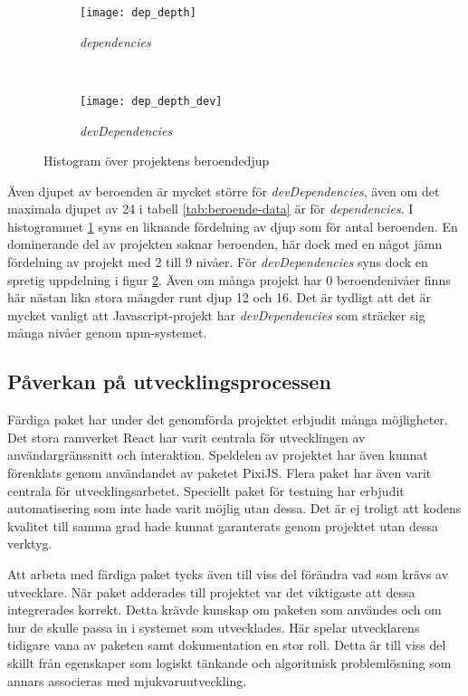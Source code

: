 \begin{figure*}
    \centering
    \begin{subfigure}[]{0.5\textwidth}
        \centering
        \texttt{[image: dep\_depth]}
        \caption{\textit{dependencies}}
        \label{fig:dep-depth-dependencies}
    \end{subfigure}%
    ~
    \begin{subfigure}[]{0.5\textwidth}
        \centering
        \texttt{[image: dep\_depth\_dev]}
        \caption{\textit{devDependencies}}
        \label{fig:dep-depth-devDependencies}
      \end{subfigure}
    \caption{Histogram över projektens beroendedjup}
    \label{fig:dep-depth}
\end{figure*}

Även djupet av beroenden är mycket större för \textit{devDependencies}, även om det maximala djupet av 24 i tabell \ref{tab:beroende-data} är för \textit{dependencies}. I histogrammet \ref{fig:dep-depth-dependencies} syns en liknande fördelning av djup som för antal beroenden. En dominerande del av projekten saknar beroenden, här dock med en något jämn fördelning av projekt med 2 till 9 nivåer. För \textit{devDependencies} syns dock en spretig uppdelning i figur \ref{fig:dep-depth-devDependencies}. Även om många projekt har 0 beroendenivåer finns här nästan lika stora mängder runt djup 12 och 16. Det är tydligt att det är mycket vanligt att Javascript-projekt har \textit{devDependencies} som sträcker sig många nivåer genom npm-systemet.

\subsection{Påverkan på utvecklingsprocessen}

Färdiga paket har under det genomförda projektet erbjudit många möjligheter. Det stora ramverket React har varit centrala för utvecklingen av användargränssnitt och interaktion. Speldelen av projektet har även kunnat förenklats genom användandet av paketet PixiJS. Flera paket har även varit centrala för utvecklingsarbetet. Speciellt paket för testning har erbjudit automatisering som inte hade varit möjlig utan dessa. Det är ej troligt att kodens kvalitet till samma grad hade kunnat garanterats genom projektet utan dessa verktyg.

Att arbeta med färdiga paket tycks även till viss del förändra vad som krävs av utvecklare. När paket adderades till projektet var det viktigaste att dessa integrerades korrekt. Detta krävde kunskap om paketen som användes och om hur de skulle passa in i systemet som utvecklades. Här spelar utvecklarens tidigare vana av paketen samt dokumentation en stor roll. Detta är till viss del skillt från egenskaper som logiskt tänkande och algoritmisk problemlösning som annars associeras med mjukvaruutveckling.

